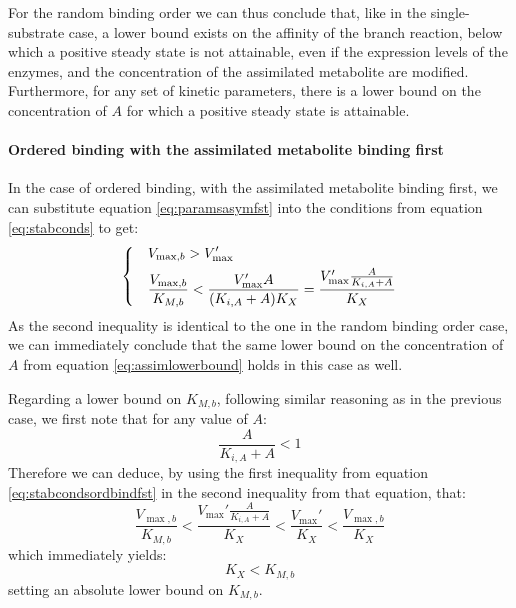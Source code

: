   For the random binding order we can thus conclude that, like in the single-substrate case, a lower bound exists on the affinity of the branch reaction, below which a positive steady state is not attainable, even if the expression levels of the enzymes, and the concentration of the assimilated metabolite are modified.
  Furthermore, for any set of kinetic parameters, there is a lower bound on the concentration of $A$ for which a positive steady state is attainable.

  \paragraph{Ordered binding with the assimilated metabolite binding first}
  In the case of ordered binding, with the assimilated metabolite binding first, we can substitute equation \ref{eq:paramsasymfst} into the conditions from equation \ref{eq:stabconds} to get:
  \begin{equation}
    \label{eq:stabcondsordbindfst}
    \begin{dcases}
      & V_{\max,b}>V_{\max}' \\
      & \frac{V_{\max,b}}{K_{M,b}}<\frac{V_{\max}'A}{(K_{i,A}+A)K_X}=\frac{V_{\max}'\frac{A}{K_{i,A}+A}}{K_X}
    \end{dcases}
  \end{equation}
  As the second inequality is identical to the one in the random binding order case, we can immediately conclude that the same lower bound on the concentration of $A$ from equation \ref{eq:assimlowerbound} holds in this case as well.

  Regarding a lower bound on $K_{M,b}$, following similar reasoning as in the previous case, we first note that for any value of $A$: 
  \begin{equation*}
    \frac{A}{K_{i,A}+A}<1
  \end{equation*}
  Therefore we can deduce, by using the first inequality from equation \ref{eq:stabcondsordbindfst} in the second inequality from that equation, that:
  \begin{equation*}
    \frac{V_{\max,b}}{K_{M,b}}<\frac{V_{\max}'\frac{A}{K_{i,A}+A}}{K_X}<\frac{V_{\max}'}{K_X}<\frac{V_{\max,b}}{K_X}
  \end{equation*}
  which immediately yields:
  \begin{equation}
    \label{eq:ordkbbound}
    K_X<K_{M,b}
  \end{equation}
  setting an absolute lower bound on $K_{M,b}$.

